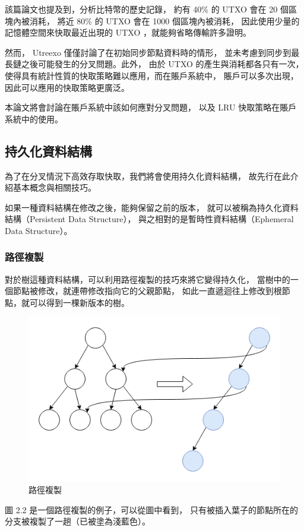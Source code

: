 該篇論文也提及到，分析比特幣的歷史記錄，
約有 40\% 的 UTXO 會在 20 個區塊內被消耗，
將近 80\% 的 UTXO 會在 1000 個區塊內被消耗，
因此使用少量的記憶體空間來快取最近出現的 UTXO ，就能夠省略傳輸許多證明。

然而， Utreexo 僅僅討論了在初始同步節點資料時的情形，
並未考慮到同步到最長鏈之後可能發生的分叉問題。此外，
由於 UTXO 的產生與消耗都各只有一次，
使得具有統計性質的快取策略難以應用，而在賬戶系統中，
賬戶可以多次出現，因此可以應用的快取策略更廣泛。

本論文將會討論在賬戶系統中該如何應對分叉問題，
以及 LRU 快取策略在賬戶系統中的使用。

\subsection{持久化資料結構}

為了在分叉情況下高效存取快取，我們將會使用持久化資料結構，
故先行在此介紹基本概念與相關技巧。

如果一種資料結構在修改之後，能夠保留之前的版本，
就可以被稱為持久化資料結構\cite{driscoll1986making}（Persistent Data Structure），
與之相對的是暫時性資料結構（Ephemeral Data Structure）。

\subsubsection{路徑複製}
對於樹這種資料結構，可以利用路徑複製的技巧來將它變得持久化，
當樹中的一個節點被修改，就連帶修改指向它的父親節點，
如此一直遞迴往上修改到根節點，就可以得到一棵新版本的樹。

\begin{figure}
\includegraphics[width=\textwidth]{../images/路徑複製.png}
\caption{路徑複製}
\end{figure}

圖 2.2 是一個路徑複製的例子，可以從圖中看到，
只有被插入葉子的節點所在的分支被複製了一趟（已被塗為淺藍色）。
